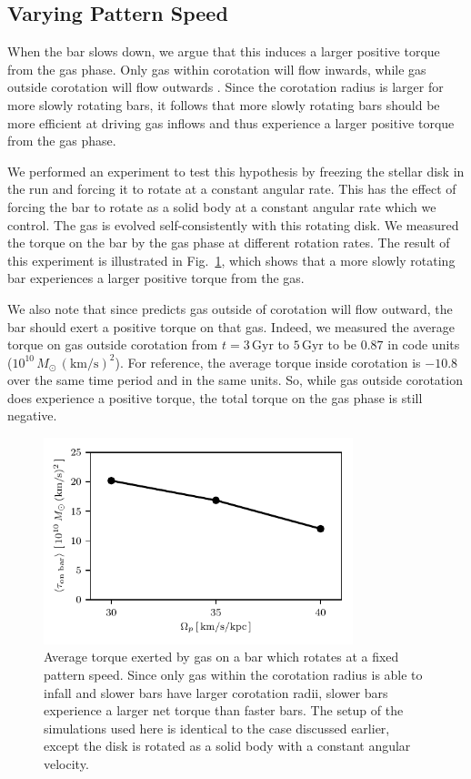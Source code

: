 \begin{appendices}
\section{Varying Pattern Speed}
\label{ch2:app:varyps}
When the bar slows down, we argue that this induces a larger positive torque
from the gas phase. Only gas within corotation will flow inwards, while gas
outside corotation will flow outwards \citep{2011MNRAS.415.1027H}. Since the
corotation radius is larger for more slowly rotating bars, it follows that
more slowly rotating bars should be more efficient at driving gas inflows and
thus experience a larger positive torque from the gas phase.

We performed an experiment to test this hypothesis by freezing the stellar
disk in the \SMUGGLE{} run and forcing it to rotate at a constant angular rate.
This has the effect of forcing the bar to rotate as a solid body at a constant
angular rate which we control. The gas is evolved self-consistently with this
rotating disk. We measured the torque on the bar by the gas phase at different
rotation rates. The result of this experiment is illustrated in
Fig.~\ref{fig:equil}, which shows that a more slowly rotating bar experiences a
larger positive torque from the gas.

We also note that since \citet{2011MNRAS.415.1027H} predicts gas outside of
corotation will flow outward, the bar should exert a positive torque on that
gas. Indeed, we measured the average torque on gas outside corotation from
$t=3\,\textrm{Gyr}$ to $5\,\textrm{Gyr}$ to be $0.87$ in code units
($10^{10}\,M_{\odot}\,(\text{km}/\text{s})^2$). For reference, the average
torque inside corotation is $-10.8$ over the same time period and in the same
units. So, while gas outside corotation does experience a positive torque, the
total torque on the gas phase is still negative.

\begin{figure}
    \centering
    \includegraphics[width=9cm]{ch2/fig/torque_ps.pdf}
    \caption{Average torque exerted by gas on a bar which rotates at a fixed
    pattern speed. Since only gas within the corotation radius is able to infall
    and slower bars have larger corotation radii, slower bars experience a
    larger net torque than faster bars. The setup of the simulations used here
    is identical to the \SMUGGLE{} case discussed earlier, except the \Nbody{} disk
    is rotated as a solid body with a constant angular
    velocity.}
    \label{fig:equil}
\end{figure}


\end{appendices}
